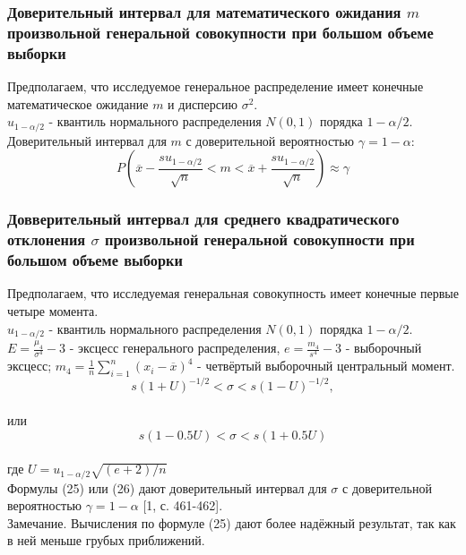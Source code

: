 	\subsubsection {Доверительный интервал для математического ожидания $m$ произвольной генеральной совокупности при большом объеме выборки}
	Предполагаем, что исследуемое генеральное распределение имеет конечные математическое ожидание $m$ и дисперсию $\sigma^2.$\\
	$u_{1-\alpha/2}$ - квантиль нормального распределения $N(0, 1)$ порядка $1 - \alpha/2$.\\
	Доверительный интервал для $m$ с доверительной вероятностью $\gamma = 1 - \alpha$:\\
	\begin{equation} P\left(\overline x - \frac{su_{1 - \alpha/2}}{\sqrt{n}} < m < \overline x + \frac{su_{1 - \alpha/2}}{\sqrt{n}}\right) \approx \gamma\end{equation}

	\subsubsection {Довверительный интервал для среднего квадратического отклонения $\sigma$ произвольной генеральной совокупности при большом объеме выборки}
	Предполагаем, что исследуемая генеральная совокупность имеет конечные первые четыре момента.\\
	$u_{1 - \alpha/2}$ - квантиль нормального распределения $N(0, 1)$ порядка $1 - \alpha/2$.\\
	$E = \frac{\mu_4}{\sigma^4} - 3$ - эксцесс генерального распределения, $e = \frac{m_4}{s^4}-3$ - выборочный эксцесс; $m_4 = \frac{1}{n}\sum_{i=1}^{n}(x_i - \overline x)^4$ - четвёртый выборочный центральный момент.\\
	\begin{equation} s(1 + U)^{-1/2} < \sigma < s(1 - U)^{-1/2}, \end{equation}\\
	или\\
	\begin{equation} s(1 - 0.5U) < \sigma < s(1 + 0.5U) \end{equation}\\
	где $U = u_{1-\alpha/2}\sqrt{(e + 2)/n}$\\
	Формулы (25) или (26) дают доверительный интервал для $\sigma$ с доверительной вероятностью $\gamma = 1 - \alpha$ [1, с. 461-462].\\
	Замечание. Вычисления по формуле (25) дают более надёжный результат, так как в ней меньше грубых приближений.
